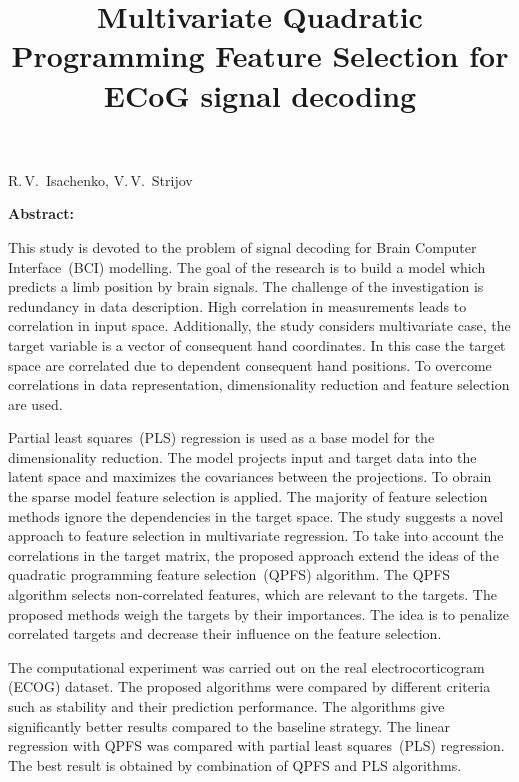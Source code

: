 \documentclass[12pt,twoside]{article}
\theoremstyle{definition}
\begin{document}
	
	\linenumbers
	
	\title
{Multivariate Quadratic Programming Feature Selection for ECoG signal decoding}
\date{}
\maketitle
\begin{center}
	R.\,V.~Isachenko,
	V.\,V.~Strijov
\end{center}
\textbf{Abstract:} 

This study is devoted to the problem of signal decoding for Brain Computer Interface~(BCI) modelling. 
The goal of the research is to build a model which predicts a limb position by brain signals. 
The challenge of the investigation is redundancy in data description. 
High correlation in measurements leads to correlation in input space. 
Additionally, the study considers multivariate case, the target variable is a vector of consequent hand coordinates. 
In this case the target space are correlated due to dependent consequent hand positions.
To overcome correlations in data representation, dimensionality reduction and feature selection are used.

Partial least squares~(PLS) regression is used as a base model for the dimensionality reduction.
The model projects input and target data into the latent space and maximizes the covariances between the projections.
To obrain the sparse model feature selection is applied.
The majority of feature selection methods ignore the dependencies in the target space.
The study suggests a novel approach to feature selection in multivariate regression.
To take into account the correlations in the target matrix, the proposed approach extend the ideas of the quadratic programming feature selection~(QPFS) algorithm. 
The QPFS algorithm selects non-correlated features, which are relevant to the targets. 
The proposed methods weigh the targets by their importances.
The idea is to penalize correlated targets and decrease their influence on the feature selection. 

The computational experiment was carried out on the real electrocorticogram (ECOG) dataset. 
The proposed algorithms were compared by different criteria such as stability and their prediction performance.
The algorithms give significantly better results compared to the baseline strategy.
The linear regression with QPFS was compared with partial least squares~(PLS) regression.
The best result is obtained by combination of QPFS and PLS algorithms.
\end{document}
